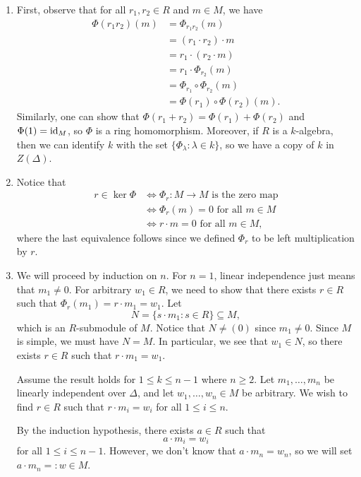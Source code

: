 \begin{enumerate}[(1)]
    \item First, observe that for all $r_1, r_2 \in R$ and $m \in M$, we have
    \begin{align*}
        \Phi(r_1r_2)(m) &= \Phi_{r_1r_2}(m) \\
        &= (r_1 \cdot r_2) \cdot m \\
        &= r_1 \cdot (r_2 \cdot m) \\
        &= r_1 \cdot \Phi_{r_2}(m) \\
        &= \Phi_{r_1} \circ \Phi_{r_2}(m) \\
        &= \Phi(r_1) \circ \Phi(r_2)(m).
    \end{align*}
    Similarly, one can show that $\Phi(r_1 + r_2) = \Phi(r_1) + \Phi(r_2)$ and $\Phi(1) = \operatorname{id}_M$, so 
    $\Phi$ is a ring homomorphism. Moreover, if $R$ is a $k$-algebra, then we can identify 
    $k$ with the set $\{\Phi_\lambda : \lambda \in k\}$, so we have a copy of $k$ in $Z(\Delta)$. 
    
    \item Notice that 
    \begin{align*}
        r \in \ker\Phi &\iff \Phi_r : M \to M \text{ is the zero map} \\
        &\iff \Phi_r(m) = 0 \text{ for all $m \in M$} \\
        &\iff r \cdot m = 0 \text{ for all $m \in M$,}
    \end{align*}
    where the last equivalence follows since we defined $\Phi_r$ to be left multiplication by $r$.
    
    \item We will proceed by induction on $n$. For $n = 1$, linear independence just means that 
    $m_1 \neq 0$. For arbitrary $w_1 \in R$, we need to show that there exists $r \in R$ such that 
    $\Phi_r(m_1) = r \cdot m_1 = w_1$. Let 
    \[ N = \{s \cdot m_1 : s \in R\} \subseteq M, \]
    which is an $R$-submodule of $M$. Notice that $N \neq (0)$ since $m_1 \neq 0$. Since $M$ is 
    simple, we must have $N = M$. In particular, we see that $w_1 \in N$, so there exists 
    $r \in R$ such that $r \cdot m_1 = w_1$. 
    
    Assume the result holds for $1 \leq k \leq n-1$ where $n \geq 2$. Let $m_1, \dots, m_n$ be 
    linearly independent over $\Delta$, and let $w_1, \dots, w_n \in M$ be arbitrary. We wish to find 
    $r \in R$ such that $r \cdot m_i = w_i$ for all $1 \leq i \leq n$. 
    
    By the induction hypothesis, there exists $a \in R$ such that 
    \[ a \cdot m_i = w_i \]
    for all $1 \leq i \leq n-1$. However, we don't know that $a \cdot m_n = w_n$, so we will set 
    $a \cdot m_n =: w \in M$. 
    

\end{enumerate}

